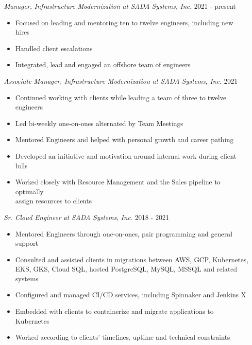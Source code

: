 \documentclass[line]{docs/resume/res}
\begin{document}
\begin{resume}
  {\sl Manager, Infrastructure Modernization at SADA Systems, Inc.} \hfill 2021 - present
  \begin{itemize} \itemsep -2pt
    \item Focused on leading and mentoring ten to twelve engineers, including new hires
    \item Handled client escalations
    \item Integrated, lead and engaged an offshore team of engineers
  \end{itemize}

  {\sl Associate Manager, Infrastructure Modernization at SADA Systems, Inc.} \hfill 2021
  \begin{itemize} \itemsep -2pt
    \item Continued working with clients while leading a team of three to twelve engineers
    \item Led bi-weekly one-on-ones alternated by Team Meetings
    \item Mentored Engineers and helped with personal growth and career pathing
    \item Developed an initiative and motivation around internal work during client lulls
    \item Worked closely with Resource Management and the Sales pipeline to optimally \\
      assign resources to clients
  \end{itemize}

  {\sl Sr. Cloud Engineer at SADA Systems, Inc.} \hfill 2018 - 2021
  \begin{itemize} \itemsep -2pt
    \item Mentored Engineers through one-on-ones, pair programming and general support
    \item Consulted and assisted clients in migrations between AWS, GCP, Kubernetes, \\
      EKS, GKS, Cloud SQL, hosted PostgreSQL, MySQL, MSSQL and related systems
    \item Configured and managed CI/CD services, including Spinnaker and Jenkins X
    \item Embedded with clients to containerize and migrate applications to Kubernetes
    \item Worked according to clients' timelines, uptime and technical constraints
  \end{itemize}


\end{resume}
\end{document}
